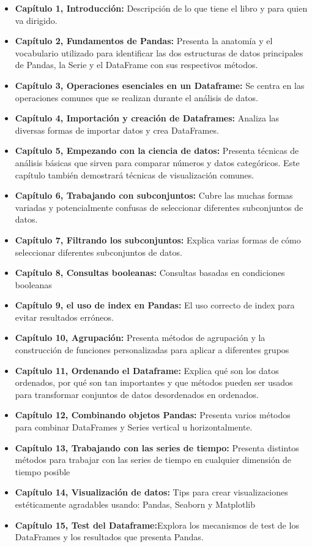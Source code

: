 \documentclass[
]{book}
\begin{document}
\begin{itemize}
\item
  \textbf{Capítulo 1, Introducción:} Descripción de lo que tiene el libro y para quien va dirigido.
\item
  \textbf{Capítulo 2, Fundamentos de Pandas:} Presenta la anatomía y el vocabulario utilizado para identificar las dos estructuras de datos principales de Pandas, la Serie y el DataFrame con sus respectivos métodos.
\item
  \textbf{Capítulo 3, Operaciones esenciales en un Dataframe:} Se centra en las operaciones comunes que se realizan durante el análisis de datos.
\item
  \textbf{Capítulo 4, Importación y creación de Dataframes:} Analiza las diversas formas de importar datos y crea DataFrames.
\item
  \textbf{Capítulo 5, Empezando con la ciencia de datos:} Presenta técnicas de análisis básicas que sirven para comparar números y datos categóricos. Este capítulo también demostrará técnicas de visualización comunes.
\item
  \textbf{Capítulo 6, Trabajando con subconjuntos:} Cubre las muchas formas variadas y potencialmente confusas de seleccionar diferentes subconjuntos de datos.
\item
  \textbf{Capítulo 7, Filtrando los subconjuntos:} Explica varias formas de cómo seleccionar diferentes subconjuntos de datos.
\item
  \textbf{Capítulo 8, Consultas booleanas:} Consultas basadas en condiciones booleanas
\item
  \textbf{Capítulo 9, el uso de index en Pandas:} El uso correcto de index para evitar resultados erróneos.
\item
  \textbf{Capítulo 10, Agrupación:} Presenta métodos de agrupación y la construcción de funciones personalizadas para aplicar a diferentes grupos
\item
  \textbf{Capítulo 11, Ordenando el Dataframe:} Explica qué son los datos ordenados, por qué son tan importantes y que métodos pueden ser usados para transformar conjuntos de datos desordenados en ordenados.
\item
  \textbf{Capítulo 12, Combinando objetos Pandas:} Presenta varios métodos para combinar DataFrames y Series vertical u horizontalmente.
\item
  \textbf{Capítulo 13, Trabajando con las series de tiempo:} Presenta distintos métodos para trabajar con las series de tiempo en cualquier dimensión de tiempo posible
\item
  \textbf{Capítulo 14, Visualización de datos:} Tips para crear visualizaciones estéticamente agradables usando: Pandas, Seaborn y Matplotlib
\item
  \textbf{Capítulo 15, Test del Dataframe:}Explora los mecanismos de test de los DataFrames y los resultados que presenta Pandas.
\end{itemize}
\end{document}
